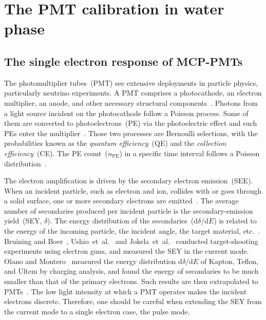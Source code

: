 \chapter{The PMT calibration in water phase}\label{sec:Introduction}

\section{The single electron response of MCP-PMTs}
The photomultiplier tubes~(PMT) see extensive deployments in particle physics, particularly neutrino experiments.
A PMT comprises a photocathode, an electron multiplier, an anode, and other necessary structural components~\cite{1955Scintillation}.
Photons from a light source incident on the photocathode follow a Poisson process.
Some of them are converted to photoelectrons~(PE) via the photoelectric effect
and such PEs enter the multiplier~\cite{2016Optimization}.
Those two processes are Bernoulli selections, with the probabilities known as the \emph{quantum efficiency}~(QE) and the \emph{collection efficiency}~(CE).
The PE count~($n_{\mathrm{PE}}$) in a specific time interval follows a Poisson distribution~\cite{1994Absolute}.

The electron amplification is driven by the secondary electron emission~(SEE).
When an incident particle, such as electron and ion, collides with or goes through a solid surface, one or more secondary electrons are emitted~\cite{2016Secondary}.
The average number of secondaries produced per incident particle is the secondary-emission yield~(SEY, $\delta$).
The energy distribution of the secondaries~(\(\mathrm{d}\delta/\mathrm{d}E\)) is related to the energy of the incoming particle,
the incident angle, the target material, etc.~\cite{2002Probabilistic}.
Bruining and Boer~\cite{1938Secondary}, Ushio~et~al.~\cite{1988Secondary} and Jokela~et~al.~\cite{2012Secondary}
conducted target-shooting experiments using electron guns,
and measured the SEY in the current mode.
Olano and Montero~\cite{OLANO2020103456} measured the energy distribution \(\mathrm{d}\delta/\mathrm{d}E\) of Kapton, Teflon, and Ultem by charging analysis,
and found the energy of secondaries to be much smaller than that of the primary electrons.
Such results are then extrapolated to PMTs~\cite{2012An,2021Effects}.
The low light intensity at which a PMT operates makes the incident electrons discrete.
Therefore, one should be careful when extending the SEY from the current mode to a single electron case, the pulse mode.

